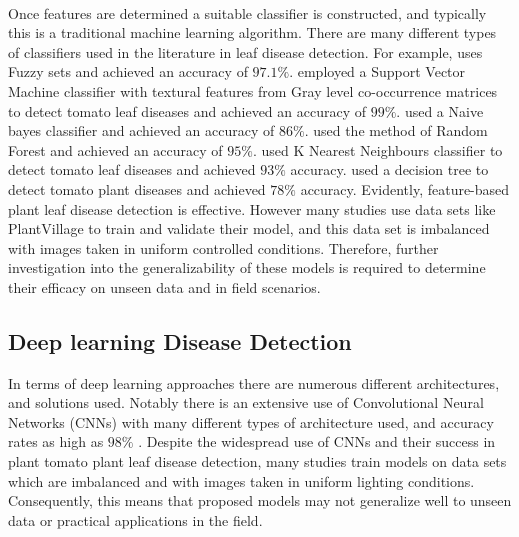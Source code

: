 \paragraph{}
Once features are determined a suitable classifier is constructed, and typically this is a traditional machine learning algorithm. There are many different types of classifiers used in the literature in leaf disease detection. For example, \cite{hussainRobustLeafDisease2024} uses Fuzzy sets and achieved an accuracy of $97.1\%$. \cite{mokhtarSVMBasedDetectionTomato2015} employed a Support Vector Machine classifier with textural features from Gray level co-occurrence matrices  to detect tomato leaf diseases and achieved an accuracy of $99\%$. \cite{basavaiahTomatoLeafDisease2020} used a Naive bayes classifier and achieved an accuracy of $86\%$. \cite{govardhanDiagnosisTomatoPlant2019a} used the method of Random Forest and achieved an accuracy of $95\%$. \cite{joshiClassificationTomatoLeaf2023} used K Nearest Neighbours classifier to detect tomato leaf diseases and achieved $93\%$ accuracy. \cite{sabrolIntensityBasedFeature2016} used a decision tree to detect tomato plant diseases and achieved $78\%$ accuracy. Evidently, feature-based plant leaf disease detection is effective. However many studies use data sets like PlantVillage to train and validate their model, and this data set is imbalanced with images taken in uniform controlled conditions. Therefore, further investigation into the generalizability of these models is required to determine their efficacy on unseen data and in field scenarios.

\subsection{Deep learning Disease Detection}
In terms of deep learning approaches there are numerous different architectures, and solutions used. Notably there is an extensive use of Convolutional Neural Networks (CNNs) with many different types of architecture used, and accuracy rates as high as $98\%$ \cite{jelaliDeepLearningNetworksbased2024a, wangEfficientDeepLearning2024, baserTomConvImprovedCNN2023, chenUsingHybridConvolutional2024, fuentesHighPerformanceDeepNeural2018, natarajanDetectionDiseaseTomato2020}. Despite the widespread use of CNNs and their success in plant tomato plant leaf disease detection, many studies train models on data sets which are imbalanced and with images taken in uniform lighting conditions. Consequently, this means that proposed models may not generalize well to unseen data or practical applications in the field. 

